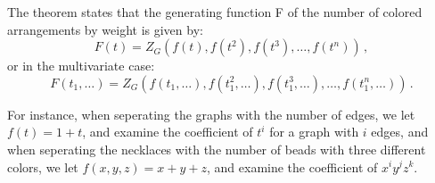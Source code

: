 The theorem states that the generating function F of the number of colored arrangements by weight is given by:
$$F(t)=Z_{G}(f(t),f(t^{2}),f(t^{3}),\ldots ,f(t^{n}))\,,$$
or in the multivariate case:
$$F(t_{1},\ldots )=Z_{G}(f(t_{1},\ldots ),f(t_{1}^{2},\ldots ),f(t_{1}^{3},\ldots ),\ldots ,f(t_{1}^{n},\ldots ))\,.$$

For instance, when seperating the graphs with the number of edges, we let $f(t)=1+t$, and examine the coefficient of $t^i$ for a graph with $i$ edges, and when seperating the necklaces with the number of beads with three different colors, we let $f(x,y,z)=x+y+z$, and examine the coefficient of $x^iy^jz^k$.
\fi
      
